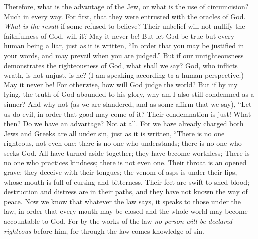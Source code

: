 \begin{biblechapter} %
 Therefore, what is the advantage of the Jew, or what is the use of circumcision?
\verse Much in every way. For first, that they were entrusted with the oracles of God.
\verse \textit{What is the result} if some refused to believe? Their unbelief will not nullify the faithfulness of God, will it?
\verse May it never be! But let God be true but every human being a liar, just as it is written, “In order that you may be justified in your words, 
and may prevail when you are judged.”
\verse But if our unrighteousness demonstrates the righteousness of God, what shall we say? God, who inflicts wrath, is not unjust, is he? (I am speaking according to a human perspective.)
\verse May it never be! For otherwise, how will God judge the world?
\verse But if by my lying, the truth of God abounded to his glory, why am I also still condemned as a sinner?
\verse And why not (as we are slandered, and as some affirm that we say), “Let us do evil, in order that good may come of it? Their condemnation is just!
 What then? Do we have an advantage? Not at all. For we have already charged both Jews and Greeks are all under sin,
\verse just as it is written,
\verse “There is no one righteous, not even one;
\verse there is no one who understands; 
there is no one who seeks God.
\verse All have turned aside together; they have become worthless; 
There is no one who practices kindness; 
there is not even one.
\verse Their throat is an opened grave; 
they deceive with their tongues; 
the venom of asps is under their lips,
\verse whose mouth is full of cursing and bitterness.
\verse Their feet are swift to shed blood;
\verse destruction and distress are in their paths,
\verse and they have not known the way of peace.
\verse Now we know that whatever the law says, it speaks to those under the law, in order that every mouth may be closed and the whole world may become accountable to God.
\verse For by the works of the law \textit{no person will be declared righteous} before him, for through the law comes knowledge of sin.

\end{biblechapter}

